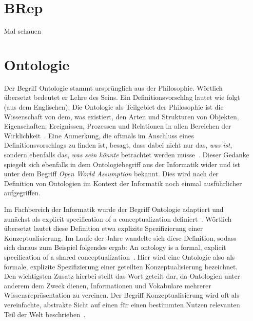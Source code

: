 \section{BRep}\label{basics:brep}
Mal schauen

\section{Ontologie}
Der Begriff Ontologie stammt ursprünglich aus der Philosophie.
Wörtlich übersetzt bedeutet er \glqq{}Lehre des Seins\grqq{}.
Ein Definitionsvorschlag lautet wie folgt (aus dem Englischen):
\glqq{}Die Ontologie als Teilgebiet der Philosophie ist die Wissenschaft von dem, was existiert, den Arten und Strukturen von Objekten, Eigenschaften, Ereignissen, Prozessen und Relationen in allen Bereichen der Wirklichkeit\grqq{}~\cite{Ontology}.
Eine Anmerkung, die oftmals im Anschluss eines Definitionsvorschlags zu finden ist, besagt, dass dabei nicht nur das, \textit{was ist}, sondern ebenfalls das, \textit{was sein könnte} betrachtet werden müsse~\cite{Ontology}\cite{OntologieDefinitionLMU:online}.
Dieser Gedanke spiegelt sich ebenfalls in dem Ontologiebegriff aus der Informatik wider und ist unter dem Begriff \textit{Open World Assumption} bekannt.
Dies wird nach der Definition von Ontologien im Kontext der Informatik noch einmal ausführlicher aufgegriffen.

Im Fachbereich der Informatik wurde der Begriff Ontologie adaptiert und zunächst als \glqq{}explicit specification of a conceptualization\grqq{} definiert~\cite{Gruber1993}.
Wörtlich übersetzt lautet diese Definition etwa \glqq{}explizite Spezifizierung einer Konzeptualisierung\grqq{}.
Im Laufe der Jahre wandelte sich diese Definition, sodass sich daraus zum Beispiel folgendes ergab: \glqq{}An ontology is a formal, explicit specification of a shared conceptualization\grqq{}~\cite{Studer1998}.
Hier wird eine Ontologie also als \glqq{}formale, explizite Spezifizierung einer geteilten Konzeptualisierung\grqq{} bezeichnet.
Den wichtigsten Zusatz hierbei stellt das Wort \glqq{}geteilt\grqq{} dar, da Ontologien unter anderem dem Zweck dienen, Informationen und Vokabulare mehrerer Wissensrepräsentation zu vereinen.
Der Begriff Konzeptualisierung wird oft als \glqq{}vereinfachte, abstrakte Sicht auf einen für einen bestimmten Nutzen relevanten Teil der Welt\grqq{} beschrieben~\cite{Guarino2009}.

